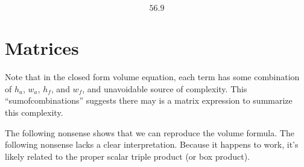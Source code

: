 \documentclass[letterpaper,10pt,english]{sphinxmanual}
\begin{document}
\begin{sphinxVerbatim}[commandchars=\\\{\}]
\end{sphinxVerbatim}
\begin{equation*}
\begin{split}\displaystyle 56.9\end{split}
\end{equation*}

\section{Matrices}
\label{\detokenize{prism-irregular:matrices}}
\sphinxAtStartPar
Note that in the closed form volume equation, each term has some combination of \(h_a\), \(w_a\), \(h_f\), and \(w_f\), and unavoidable source of complexity. This “sum\sphinxhyphen{}of\sphinxhyphen{}combinations” suggests there may is a matrix expression to summarize this complexity.

\sphinxAtStartPar
The following nonsense shows that we can reproduce the volume formula. The following nonsense lacks a clear interpretation. Because it happens to work, it’s likely related to the proper scalar triple product (or box product).

\begin{sphinxVerbatim}[commandchars=\\\{\}]
  \PYG{p}{[} \PYG{p}{]}
  \PYG{p}{[} \PYG{p}{]}
\end{sphinxVerbatim}
\end{document}
